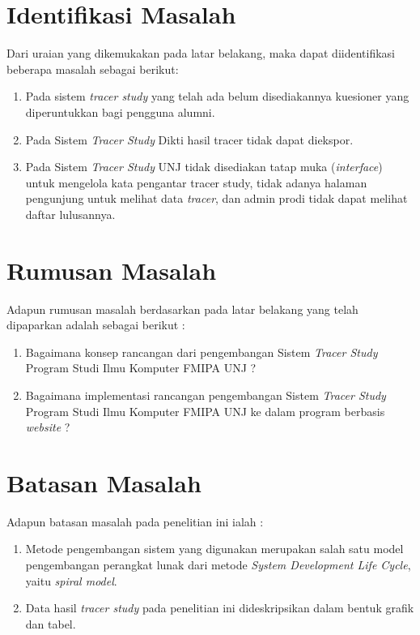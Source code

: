 \section{Identifikasi Masalah}
Dari uraian yang dikemukakan pada latar belakang, maka dapat diidentifikasi beberapa masalah sebagai berikut:
\begin{enumerate}
	\item Pada sistem \textit{tracer study} yang telah ada belum disediakannya kuesioner yang diperuntukkan bagi pengguna alumni.
	
	\item Pada Sistem \textit{Tracer Study} Dikti hasil tracer tidak dapat diekspor.
	
	\item Pada Sistem \textit{Tracer Study} UNJ tidak disediakan tatap muka (\textit{interface}) untuk mengelola kata pengantar tracer study, tidak adanya halaman pengunjung untuk melihat data \textit{tracer}, dan admin prodi tidak dapat melihat daftar lulusannya. 
	
\end{enumerate}

\section{Rumusan Masalah}
Adapun rumusan masalah berdasarkan pada latar belakang yang telah dipaparkan adalah sebagai berikut :
\begin{enumerate}
	\item Bagaimana konsep rancangan dari pengembangan Sistem \textit{Tracer Study} Program Studi Ilmu Komputer FMIPA UNJ ?
	
	\item Bagaimana implementasi rancangan pengembangan Sistem \textit{Tracer Study} Program Studi Ilmu Komputer FMIPA UNJ ke dalam program berbasis \textit{website} ?
\end{enumerate}

\section{Batasan Masalah}
Adapun batasan masalah pada penelitian ini ialah :
\begin{enumerate}
	\item Metode pengembangan sistem yang digunakan merupakan salah satu model pengembangan perangkat lunak dari metode \textit{System Development Life Cycle}, yaitu \textit{spiral model}.
	
	\item Data hasil \textit{tracer study} pada penelitian ini dideskripsikan dalam bentuk grafik dan tabel.
\end{enumerate}

